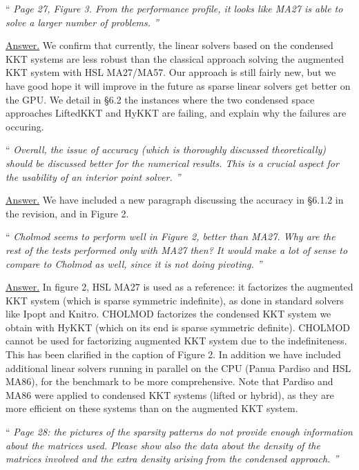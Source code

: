 \documentclass[10pt,a4paper]{article}
\newenvironment{quotereviewer}{\vspace{.5cm}{\underline\reviewername} ``\it\footnotesize}{''}
\newcommand{\answer}{\vspace{1mm}\underline{Answer.} }
\begin{document}
\begin{quotereviewer}
Page 27, Figure 3. From the performance profile, it looks like MA27 is able to solve a larger number of problems.
\end{quotereviewer}

\answer We confirm that currently, the linear solvers based on the condensed KKT systems are less robust than
the classical approach solving the augmented KKT system with HSL MA27/MA57.
Our approach is still fairly new, but we have good hope it will improve in the future
as sparse linear solvers get better on the GPU.
We detail in \S 6.2 the instances where the two condensed space approaches LiftedKKT
and HyKKT are failing, and explain why the failures are occuring.


\begin{quotereviewer}
Overall, the issue of accuracy (which is thoroughly discussed theoretically) should be discussed better for the numerical results. This is a crucial aspect for the usability of an interior point solver.
\end{quotereviewer}

\answer We have included a new paragraph discussing the accuracy
in \S 6.1.2 in the revision, and in Figure 2.

\begin{quotereviewer}
Cholmod seems to perform well in Figure 2, better than MA27. Why are the rest of the tests performed only with MA27 then? It would make a lot of sense to compare to Cholmod as well, since it is not doing pivoting.
\end{quotereviewer}

\answer In figure 2, HSL MA27 is used as a reference: it factorizes
the augmented KKT system (which is sparse symmetric indefinite), as done in standard solvers like Ipopt and Knitro.
CHOLMOD factorizes the condensed KKT system we obtain with HyKKT (which on its end is sparse symmetric definite).
CHOLMOD cannot be used for factorizing augmented KKT system due to the indefiniteness.
This has been clarified in the caption of Figure 2.
In addition we have included additional linear solvers running in parallel
on the CPU (Panua Pardiso and HSL MA86), for the benchmark to be more comprehensive.
Note that Pardiso and MA86 were applied to condensed KKT systems (lifted or hybrid), as they are more efficient on these systems than on the augmented KKT system.

\begin{quotereviewer}
Page 28: the pictures of the sparsity patterns do not provide enough information about the matrices used. Please show also the data about the density of the matrices involved and the extra density arising from the condensed approach.
\end{quotereviewer}
\end{document}
